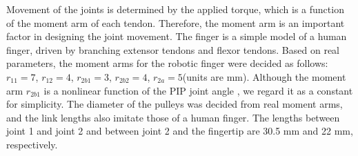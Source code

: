\documentclass{llncs}
\begin{document}
Movement of the joints is determined by the applied torque, which is a function of the moment arm of each tendon.
Therefore, the moment arm is an important factor in designing the joint movement.
The finger is a simple model of a human finger, driven by branching extensor tendons and flexor tendons.
Based on real parameters\cite{Leijnse1995,Spoor1993}, the moment arms for the robotic finger were decided as follows:
 $r_{11}=7$, $r_{12}=4$, $r_{2b1}=3$, $r_{2b2}=4$, $r_{2a}=5$(units are mm).
Although the moment arm $r_{2b1}$ is a nonlinear function of the PIP joint angle
\cite{Leijnse1995}, we regard it as a constant for simplicity.
The diameter of the pulleys
was decided from real moment arms, and the link lengths also imitate those of a human finger.
The lengths between joint 1 and joint 2
and between joint 2 and the fingertip are 30.5 mm and 22 mm, respectively.
		
\end{document}
